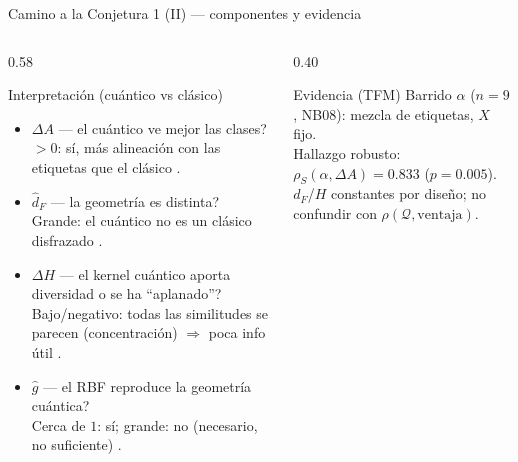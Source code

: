 \documentclass[aspectratio=169,10pt,professionalfonts]{beamer}
\begin{document}
\begin{frame}{Camino a la Conjetura 1 (II) --- componentes y evidencia}
\begin{columns}[T]
\begin{column}{0.58\textwidth}
\begin{block}{Interpretación (cuántico vs clásico)}
{\footnotesize
\begin{itemize}
  \item $\Delta A$ --- \textquestiondown{}el cuántico ve mejor las clases?\\
        $>0$: sí, más alineación con las etiquetas
        que el clásico \citep{cortes2012, huang2021}.
  \item $\hat{d}_F$ --- \textquestiondown{}la geometría es distinta?\\
        Grande: el cuántico no es un clásico
        disfrazado \citep{liu2021}.
  \item $\Delta H$ --- \textquestiondown{}el kernel cuántico aporta
        diversidad o se ha ``aplanado''?\\
        Bajo/negativo: todas las similitudes se parecen
        (concentración) $\Rightarrow$ poca info útil
        \citep{thanasilp2022}.
  \item $\hat g$ --- \textquestiondown{}el RBF reproduce la geometr\'ia
        cu\'antica?\\
        Cerca de $1$: s\'i; grande: no (necesario, no suficiente)
        \citep{huang2021}.
\end{itemize}}
\end{block}
\end{column}
\begin{column}{0.40\textwidth}
\begin{block}{Evidencia (TFM)}
Barrido $\alpha$ ($n{=}9$, NB08):
mezcla de etiquetas, $X$ fijo.\\[0.25em]
Hallazgo robusto:
$\rho_S(\alpha,\Delta A){=}0.833$
($p{=}0.005$).\\[0.25em]
{\footnotesize $d_F$/$H$ constantes por diseño;
no confundir con
$\rho(\mathcal{Q},\mathrm{ventaja})$.}
\end{block}
\end{column}
\end{columns}
\end{frame}
\end{document}
